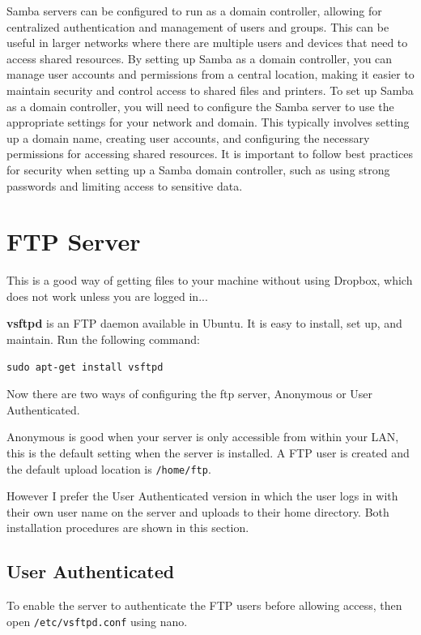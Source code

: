 Samba servers can be configured to run as a domain controller, allowing for centralized authentication and management of users and groups. This can be useful in larger networks where there are multiple users and devices that need to access shared resources. By setting up Samba as a domain controller, you can manage user accounts and permissions from a central location, making it easier to maintain security and control access to shared files and printers. To set up Samba as a domain controller, you will need to configure the Samba server to use the appropriate settings for your network and domain. This typically involves setting up a domain name, creating user accounts, and configuring the necessary permissions for accessing shared resources. It is important to follow best practices for security when setting up a Samba domain controller, such as using strong passwords and limiting access to sensitive data.

\section{FTP Server}
\label{sec:ftp}

This is a good way of getting files to your machine without using Dropbox, which does not work unless you are logged in...

\textbf{vsftpd} is an FTP daemon available in Ubuntu. It is easy to install, set up, and maintain. Run the following command:

\begin{lstlisting}
sudo apt-get install vsftpd
\end{lstlisting}

Now there are two ways of configuring the ftp server, Anonymous or User Authenticated.

Anonymous is good when your server is only accessible from within your LAN, this is the default setting when the server is installed.  A FTP user is created and the default upload location is \texttt{/home/ftp}.

However I prefer the User Authenticated version in which the user logs in with their own user name on the server and uploads to their home directory.  Both installation procedures are shown in this section.

\subsection{User Authenticated}

To enable the server to authenticate the FTP users before allowing access, then open \texttt{/etc/vsftpd.conf} using nano.

